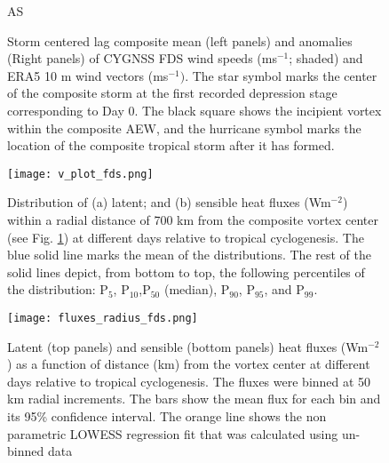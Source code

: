 \documentclass[draft]{agujournal2019}
\begin{document}
%
\begin{figure}
 \caption{Storm centered lag composite mean (left panels) and anomalies (Right panels) of CYGNSS FDS wind speeds (ms$^{-1}$;  shaded) and ERA5 10 m wind vectors (ms$^{-1})$. The star symbol marks the center of the composite storm at the first recorded depression stage corresponding to Day 0. The black square shows the incipient vortex within the composite AEW, and the hurricane symbol marks the location of the composite tropical storm after it has formed.}
 \label{fig:comp}

AS\end{figure}


\begin{figure}
 \texttt{[image: v\_plot\_fds.png]}
 \caption{Distribution of (a) latent; and (b) sensible heat fluxes (Wm$^{-2}$) within a radial distance of 700 km from the composite vortex center (see Fig. \ref{fig:comp}) at different days relative to tropical cyclogenesis. The blue solid line marks the mean of the distributions. The rest of the solid lines depict, from bottom to top, the following percentiles of the distribution: P$_5$, P$_{10}$,P$_{50}$ (median), P$_{90}$, P$_{95}$, and P$_{99}$.}
 \label{fig:vplot_fds}
\end{figure}


\begin{figure}
 \texttt{[image: fluxes\_radius\_fds.png]}
 \caption{Latent (top panels) and sensible (bottom panels) heat fluxes (Wm$^{-2}$) as a function of distance (km) from the vortex center at different days relative to tropical cyclogenesis. The fluxes were binned at 50 km radial increments. The bars show the  mean flux for each bin and its 95\% confidence interval. The orange line shows the non parametric LOWESS regression fit that was calculated using un-binned data}
 \label{fig:flux_rad_comp}
\end{figure}




\end{document}
